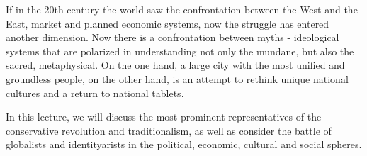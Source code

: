 If in the 20th century the world saw the confrontation between the West and the
East, market and planned economic systems, now the struggle has entered another
dimension. Now there is a confrontation between myths - ideological systems
that are polarized in understanding not only the mundane, but also the sacred,
metaphysical. On the one hand, a large city with the most unified and
groundless people, on the other hand, is an attempt to rethink unique national
cultures and a return to national tablets.

In this lecture, we will discuss the most prominent representatives of the
conservative revolution and traditionalism, as well as consider the battle of
globalists and identityarists in the political, economic, cultural and social
spheres.

